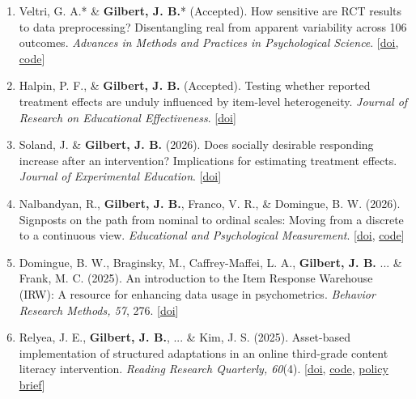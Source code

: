 \documentclass[11pt]{article}
\begin{document}
\begin{enumerate}
\subsubsection{Co-authored (Education/Quantitative Methods) (N = 11)}

\item Veltri, G. A.* \& \textbf{Gilbert, J. B.}* (Accepted). How sensitive are RCT results to data preprocessing? Disentangling real from apparent variability across 106 outcomes. \textit{Advances in Methods and Practices in Psychological Science}. [\href{https://doi.org/10.31222/osf.io/kbgc2_v2}{doi}, \href{https://osf.io/7j5du/overview}{code}]
\item Halpin, P. F., \& \textbf{Gilbert, J. B.} (Accepted). Testing whether reported treatment effects are unduly influenced by item-level heterogeneity. \textit{Journal of Research on Educational Effectiveness}. [\href{https://osf.io/preprints/psyarxiv/9ru45_v1}{doi}]
\item Soland, J. \& \textbf{Gilbert, J. B.} (2026). Does socially desirable responding increase after an intervention? Implications for estimating treatment effects. \textit{Journal of Experimental Education}. [\href{https://doi.org/10.1080/00220973.2026.2730118}{doi}]
\item Nalbandyan, R., \textbf{Gilbert, J. B.}, Franco, V. R., \& Domingue, B. W. (2026). Signposts on the path from nominal to ordinal scales: Moving from a discrete to a continuous view. \textit{Educational and Psychological Measurement}. [\href{https://journals.sagepub.com/doi/10.1177/00131644261440556}{doi}, \href{https://github.com/rn2407stanford/Category_Order}{code}]
\item Domingue, B. W., Braginsky, M., Caffrey-Maffei, L. A., \textbf{Gilbert, J. B.} ... \& Frank, M. C. (2025). An introduction to the Item Response Warehouse (IRW): A resource for enhancing data usage in psychometrics. \textit{Behavior Research Methods, 57}, 276. [\href{https://doi.org/10.3758/s13428-025-02796-y}{doi}] 
\item Relyea, J. E., \textbf{Gilbert, J. B.}, ... \& Kim, J. S. (2025). Asset-based implementation of structured adaptations in an online third-grade content literacy intervention. \textit{Reading Research Quarterly, 60}(4). [\href{https://doi.org/10.1002/rrq.70048}{doi}, \href{https://doi.org/10.7910/DVN/JDUIKT}{code}, \href{https://edworkingpapers.com/policy-practice-series/ai24-1001}{policy brief}] \label{adaptive_more}

\end{enumerate}
\end{document}
